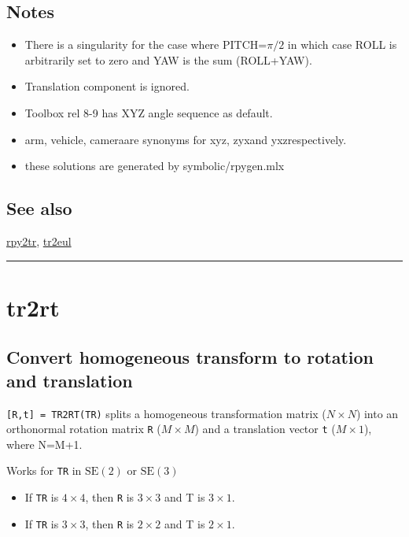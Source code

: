 \subsection*{Notes}
\begin{itemize}
  \item There is a singularity for the case where PITCH=$\pi/2$ in which case ROLL is arbitrarily    set to zero and YAW is the sum (ROLL+YAW).
  \item Translation component is ignored.
  \item Toolbox rel 8-9 has XYZ angle sequence as default.
  \item \textquotesingle arm\textquotesingle , \textquotesingle vehicle\textquotesingle , \textquotesingle camera\textquotesingle  are synonyms for \textquotesingle xyz\textquotesingle , \textquotesingle zyx\textquotesingle  and \textquotesingle yxz\textquotesingle     respectively.
  \item these solutions are generated by symbolic/rpygen.mlx
\end{itemize}

\subsection*{See also}


\hyperlink{rpy2tr}{\color{blue} rpy2tr}, \hyperlink{tr2eul}{\color{blue} tr2eul}

\vspace{1.5ex}\rule{\textwidth}{1mm}

\hypertarget{tr2rt}{\section*{tr2rt}}
\subsection*{Convert homogeneous transform to rotation and translation}


\texttt{[R,t] = TR2RT(TR)} splits a homogeneous transformation matrix ($N \times N$) into an
orthonormal rotation matrix \texttt{R} ($M \times M$) and a translation vector \texttt{t} ($M \times 1$), where
N=M+1.



Works for \texttt{TR} in $\mbox{SE}(2)$ or $\mbox{SE}(3)$

\begin{itemize}
  \item If \texttt{TR} is $4 \times 4$, then \texttt{R} is $3 \times 3$ and T is $3 \times 1$.
  \item If \texttt{TR} is $3 \times 3$, then \texttt{R} is $2 \times 2$ and T is $2 \times 1$.
\end{itemize}


